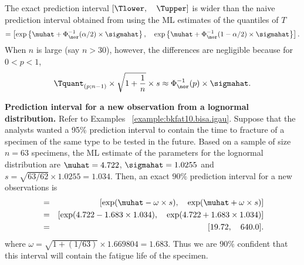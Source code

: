 The exact prediction interval $[\Tlower, \quad \Tupper]$ is wider than the 
naive prediction interval obtained from using the ML estimates
of the quantiles of $T$
\begin{displaymath}
[\rvquanhat_{\alpha/2},\quad\rvquanhat_{1-\alpha/2}]
=
\left [
\exp \left \{
\muhat+
\Phi^{-1}_{\nor}(\alpha/2)
\times 
\sigmahat
     \right \},
\quad
\exp \left \{
\muhat+
\Phi^{-1}_{\nor}(1-\alpha/2)
\times 
\sigmahat
     \right \}
\right ].
\end{displaymath}
When $n$ is large (say $n>30$), however, the differences are
negligible because for $0<p<1$,
\begin{displaymath}
\Tquant_{(p;n-1)}
 \times
\sqrt{1+ \frac{ 1 } { n } } \times s
\approx 
\Phi^{-1}_{\nor}(p) \times \sigmahat.
\end{displaymath}
\begin{example}
\label{example:prediction.complete.data.lognormal}
{\bf Prediction interval for a new observation from a lognormal
distribution.}  Refer to Examples ~\ref{example:bkfat10.bisa.igau}.
Suppose that the analysts wanted a 95\% prediction interval to
contain the time to fracture of a specimen of the same type to be
tested in the future. Based on a sample of size $n=63$ specimens,
the ML estimate of the parameters for the lognormal distribution are
$\muhat=4.722$, $\sigmahat=1.0255$ and $s= \sqrt{63/62} \times
1.0255=1.034$.
Then, an exact $90\%$ prediction interval for a 
new observations is
\begin{eqnarray*}
[\Tlower, \quad \Tupper]
&=& [\exp(\muhat - \omega \times  s ), 
\quad
\exp(\muhat + \omega  \times s) ]\\
&=& [ \exp(4.722  -1.683 \times  1.034 ), 
\quad
\exp( 4.722 + 1.683  \times 1.034) ]\\
&=&[19.72, \quad 640.0].
\end{eqnarray*}
where $\omega=\sqrt{1+(1/63 )} \times 1.669804 = 1.683 $.
Thus we are $90\%$ confident that this interval
will contain the fatigue life of the specimen.
\end{example}

